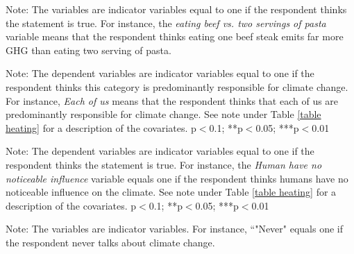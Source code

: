 \documentclass{article}
\begin{document}
\begin{table}[h!]
	\caption{Comparisons of GHG emissions}
	\begin{center}
		\scalebox{0.7}{}
	\end{center}
	{\footnotesize Note: The variables are indicator variables equal to one if the respondent thinks the statement is true. For instance, the \textit{eating beef vs. two servings of pasta} variable means that the respondent thinks eating one beef steak emits far more GHG than eating two serving of pasta. }
\end{table}		

\begin{landscape}
	\begin{table}[h!]
		\caption{Responsible party for CC}
		\begin{center}
			\scalebox{0.6}{}
		\end{center}
	{\footnotesize Note: The dependent variables are indicator variables equal to one if the respondent thinks this category is predominantly responsible for climate change. For instance, \textit{Each of us} means that the respondent thinks that each of us are predominantly responsible for climate change. See note under Table \ref{table heating} for a description of the covariates.
	\newline *p$<$0.1; **p$<$0.05; ***p$<$0.01}
	\end{table}		
\end{landscape}

\begin{landscape}
	\begin{table}[h!]
		\caption{Possible to halt CC}
		\begin{center}
			\scalebox{0.6}{}
		\end{center}
	{\footnotesize Note: The dependent variables are indicator variables equal to one if the respondent thinks the statement is true. For instance, the \textit{Human have no noticeable influence} variable equals one if the respondent thinks humans have no noticeable influence on the climate. See note under Table \ref{table heating} for a description of the covariates.
	\newline *p$<$0.1; **p$<$0.05; ***p$<$0.01}
	\end{table}		
\end{landscape}

\begin{table}[h!]
	\caption{Talks often about CC}
	\begin{center}
		\scalebox{0.8}{}
	\end{center}
	{\footnotesize Note: The variables are indicator variables. For instance, ``"Never" equals one if the respondent never talks about climate change.}
\end{table}		
\end{document}
